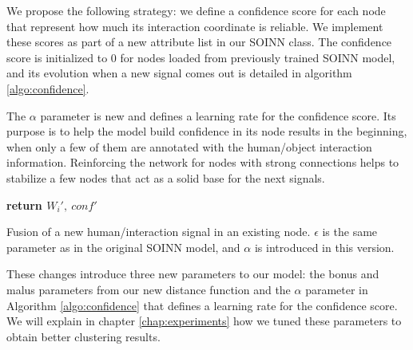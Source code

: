 We propose the following strategy: we define a confidence score for each node that represent how much its interaction coordinate is reliable. We implement these scores as part of a new attribute list in our SOINN class. The confidence score is initialized to 0 for nodes loaded from previously trained SOINN model, and its evolution when a new signal comes out is detailed in algorithm \ref{algo:confidence}. 

The $\alpha$ parameter is new and defines a learning rate for the confidence score. Its purpose is to help the model build confidence in its node results in the beginning, when only a few of them are annotated with the human/object interaction information. Reinforcing the network for nodes with strong connections helps to stabilize a few nodes that act as a solid base for the next signals.

\begin{algorithm}[htp]
    \textbf{return $W_i', ~conf'$}
    \caption[Fusion of a new human/interaction signal in an existing node]{Fusion of a new human/interaction signal in an existing node. $\epsilon$ is the same parameter as in the original SOINN model, and $\alpha$ is introduced in this version.}
    \label{algo:confidence}
\end{algorithm}

These changes introduce three new parameters to our model: the bonus and malus parameters from our new distance function and the $\alpha$ parameter in Algorithm \ref{algo:confidence} that defines a learning rate for the confidence score. We will explain in chapter \ref{chap:experiments} how we tuned these parameters to obtain better clustering results.